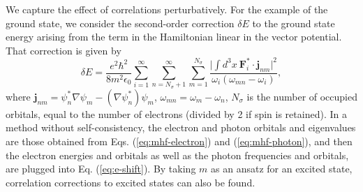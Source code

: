 \documentclass[aps,prl,twocolumn,
	groupedaddress,superscriptaddress,
	amsfonts,amssymb,amsmath,floatfix,
	citeautoscript]{revtex4-1}
\begin{document}
We capture the effect of correlations perturbatively. For the example of the ground state, we consider the second-order correction $\delta E$ to the ground state energy arising from the term in the Hamiltonian linear in the vector potential. That correction is given by 
\begin{equation}
\delta E = \frac{e^2\hbar^2}{8m^2\epsilon_0}\sum\limits_{i=1}^{\infty}\sum_{n=N_{\sigma}+1}^{\infty}\sum\limits_{m=1}^{N_{\sigma}} \frac{\Big| \int d^3x~\mathbf{F}_i^*\cdot\mathbf{j}_{nm}\Big|^2}{\omega_i(\omega_{mn} -\omega_i)},
\label{eq:e-shift}
\end{equation}
where $\mathbf{j}_{nm} = \psi^*_n\nabla\psi_m - (\nabla\psi^*_n)\psi_m$, $\omega_{mn} = \omega_m - \omega_n$, $N_{\sigma}$ is the number of occupied orbitals, equal to the number of electrons (divided by 2 if spin is retained).  In a method without self-consistency, the electron and photon orbitals and eigenvalues are those obtained from Eqs. (\ref{eq:mhf-electron}) and (\ref{eq:mhf-photon}), and then the electron energies and orbitals as well as the photon frequencies and orbitals, are plugged into Eq. (\ref{eq:e-shift}). By taking $m$ as an ansatz for an excited state, correlation corrections to excited states can also be found.
\end{document}
